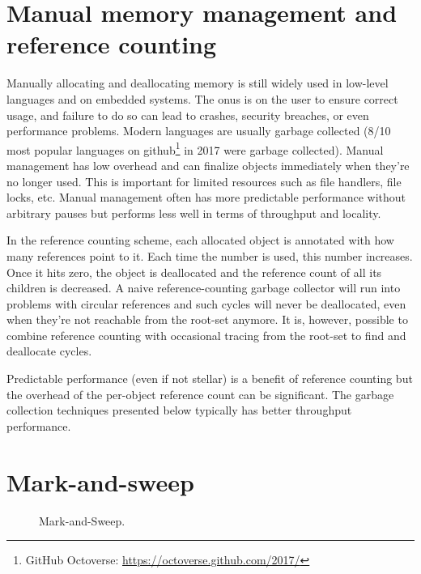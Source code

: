 \documentclass[a4paper,oneside]{memoir}
\begin{document}

\section{Manual memory management and reference counting}
Manually allocating and deallocating memory is still widely used in low-level
languages and on embedded systems. The onus is on the user to ensure correct
usage, and failure to do so can lead to crashes, security breaches, or even
performance problems.
Modern languages are usually garbage collected (8/10 most popular languages on
github\footnote{GitHub Octoverse: \url{https://octoverse.github.com/2017/}}
in 2017 were garbage collected).
Manual management has low overhead and can finalize objects immediately when
they're no longer used. This is important for limited resources such as file
handlers, file locks, etc.
Manual management often has more predictable performance without arbitrary pauses
but performs less well in terms of throughput and locality.

In the reference counting scheme, each allocated object is annotated with how
many references point to it. Each time the number is used, this number
increases. Once it hits zero, the object is deallocated and the reference
count of all its children is decreased. A naive reference-counting garbage
collector will run into problems with circular references and such cycles
will never be deallocated, even when they're not reachable from the root-set
anymore. It is, however, possible to combine reference counting with occasional
tracing from the root-set to find and deallocate cycles.

Predictable performance (even if not stellar) is a benefit of reference counting
but the overhead of the per-object reference count can be significant. The
garbage collection techniques presented below typically has better throughput
performance.

\section{Mark-and-sweep}
\begin{figure}[b]
  \centering
  
  \caption{Mark-and-Sweep.}
  \label{mark_and_sweep}
\end{figure}
\end{document}

